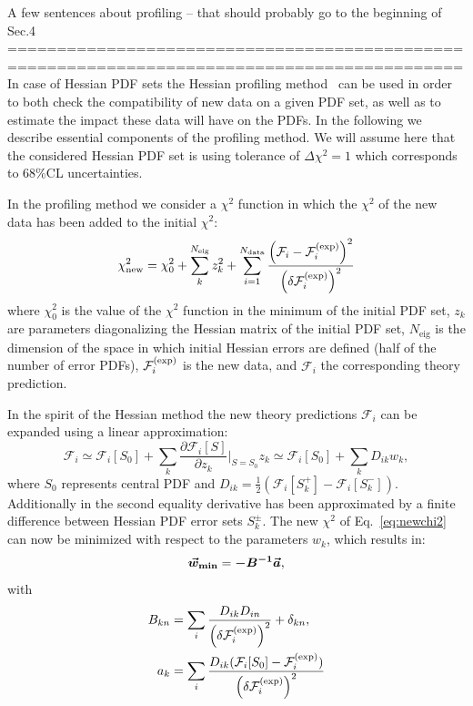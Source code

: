 A few sentences about profiling -- that should probably go to the beginning of Sec.4\\
==============================================\\
==============================================\\
In case of Hessian PDF sets the Hessian profiling method~\cite{Paukkunen:2014zia}
can be used in order to both check the compatibility of new data on a given PDF set,
as well as to estimate the impact these data will have on the PDFs. In the following
we describe essential components of the profiling method. We will assume here that the
considered Hessian PDF set is using tolerance of $\Delta\chi^2=1$ which corresponds to
68\%CL uncertainties.

In the profiling method we consider a $\chi^2$ function in which the $\chi^2$ of the new
data has been added to the initial $\chi^2$:
\begin{equation}
\label{eq:newchi2}
\chi^2_{\text{new}} = \chi_0^2 + \sum_{k}^{N_{\text{eig}}} z_k^2
                    + \sum_{i=1}^{N_{\text{data}}}
                      {{\left( \mathcal{F}_i - \mathcal{F}_i^{\rm(exp)}\right)^2}\over {\left(\delta\mathcal{F}_i^{\rm(exp)}\right)^2}}
\end{equation}
where $\chi^2_0$ is the value of the $\chi^2$ function in the minimum of the initial PDF set,
$z_k$ are parameters diagonalizing the Hessian matrix of the initial PDF set,
$N_{\text{eig}}$ is the dimension of the space in which initial Hessian errors are defined
(half of the number of error PDFs), $\mathcal{F}_i^{\rm(exp)}$ is the new data,
and $\mathcal{F}_i$ the corresponding theory prediction.

In the spirit of the Hessian method the new theory predictions $\mathcal{F}_i$ can be expanded
using a linear approximation:
\begin{equation}
\mathcal{F}_i \simeq \mathcal{F}_i[S_0] + \sum_k \frac{\partial\mathcal{F}_i[S]}{\partial z_k}\bigg|_{S=S_0} z_k
              \simeq \mathcal{F}_i[S_0] + \sum_k D_{ik} w_k,
\end{equation}
where $S_0$ represents central PDF and $D_{ik}=\frac{1}{2}(\mathcal{F}_i[S_k^+]-\mathcal{F}_i[S_k^-])$.
Additionally in the second equality derivative has been approximated by a finite difference between
Hessian PDF error sets $S_k^{\pm}$.
%
The new $\chi^2$ of Eq.~\eqref{eq:newchi2} can now be minimized with respect to the parameters $w_k$,
which results in:
\begin{equation}
\boldsymbol{\vec{w}_{\text{{\bf min}}}} = \boldsymbol{-B^{-1}} \boldsymbol{\vec{a}},
\end{equation}
with
\begin{equation}
\begin{split}
B_{kn} &= \sum_i {{D_{ik}D_{in}}\over {\left(\delta\mathcal{F}_i^{\rm(exp)}\right)^2}} + \delta_{kn},\\
a_k &= \sum_i {{D_{ik}(\mathcal{F}_i[S_0] - \mathcal{F}_i^{\rm(exp)})}\over {\left(\delta\mathcal{F}_i^{\rm(exp)}\right)^2}}
\end{split}
\end{equation}


